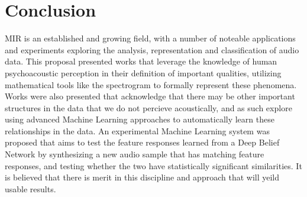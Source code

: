 \documentclass[12pt]{article}
\begin{document}

\section{Conclusion}
MIR is an established and growing field, with a number of noteable applications and experiments exploring the analysis, representation and classification of audio data. This proposal presented works that leverage the knowledge of human psychoacoustic perception in their definition of important qualities, utilizing mathematical tools like the spectrogram to formally represent these phenomena. Works were also presented that acknowledge that there may be other important structures in the data that we do not percieve acoustically, and as such explore using advanced Machine Learning approaches to automatically learn these relationships in the data. An experimental Machine Learning system was proposed that aims to test the feature responses learned from a Deep Belief Network by synthesizing a new audio sample that has matching feature responses, and testing whether the two have statistically significant similarities. It is believed that there is merit in this discipline and approach that will yeild usable results.

{}

\end{document}
